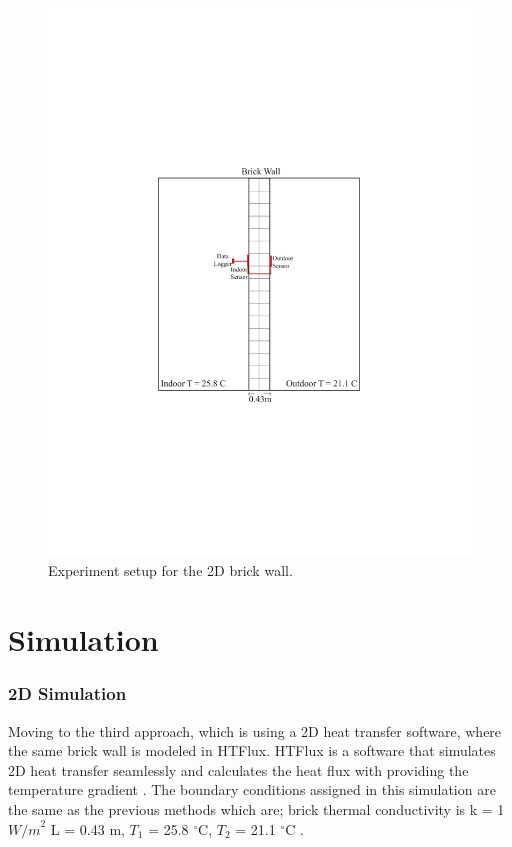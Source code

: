 \begin{figure}[H]
  \centering
  \includegraphics[trim=5.6cm 7.5cm 5.3cm 8cm, clip, width=.6\linewidth]{Figures/2dsection2.pdf}
\caption[2D Section and Setup]{Experiment setup for the 2D brick wall.}
\label{fig:2d2}
\end{figure}




















\section{Simulation}
\subsubsection{2D Simulation}
Moving to the third approach, which is using a 2D heat transfer software, where the same brick wall is modeled in HTFlux. HTFlux is a software that simulates 2D heat transfer seamlessly and calculates the heat flux with providing the temperature gradient \cite{HTflux}. The boundary conditions assigned in this simulation are the same as the previous methods which are; brick thermal conductivity is k  = 1 ${W/m}^2$ 
L  = 0.43 m,
$T_1$ = 25.8 $^\circ \text{C}$, 
$T_2$  = 21.1  $^\circ \text{C}$ .


